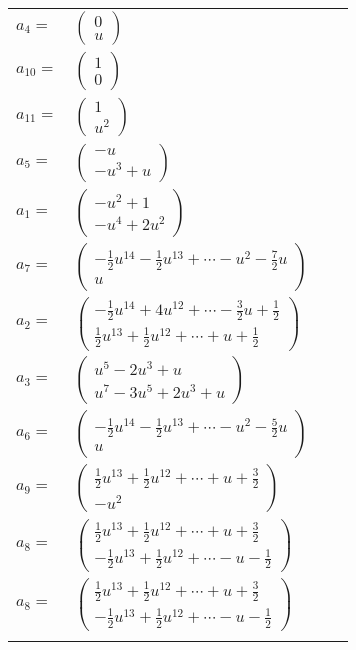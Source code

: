 \documentclass[1p]{elsarticle_modified}
\theoremstyle{definition}
\begin{document}
\begin{tabular}{m{7pt} m{180pt} m{7pt} m{180pt} }
\flushright $a_{4}=$&$\begin{pmatrix}0\\u\end{pmatrix}$ \\
\flushright $a_{10}=$&$\begin{pmatrix}1\\0\end{pmatrix}$ \\
\flushright $a_{11}=$&$\begin{pmatrix}1\\u^2\end{pmatrix}$ \\
\flushright $a_{5}=$&$\begin{pmatrix}- u\\- u^3+u\end{pmatrix}$ \\
\flushright $a_{1}=$&$\begin{pmatrix}- u^2+1\\- u^4+2 u^2\end{pmatrix}$ \\
\flushright $a_{7}=$&$\begin{pmatrix}-\frac{1}{2} u^{14}-\frac{1}{2} u^{13}+\cdots- u^2-\frac{7}{2} u\\u\end{pmatrix}$ \\
\flushright $a_{2}=$&$\begin{pmatrix}-\frac{1}{2} u^{14}+4 u^{12}+\cdots-\frac{3}{2} u+\frac{1}{2}\\\frac{1}{2} u^{13}+\frac{1}{2} u^{12}+\cdots+u+\frac{1}{2}\end{pmatrix}$ \\
\flushright $a_{3}=$&$\begin{pmatrix}u^5-2 u^3+u\\u^7-3 u^5+2 u^3+u\end{pmatrix}$ \\
\flushright $a_{6}=$&$\begin{pmatrix}-\frac{1}{2} u^{14}-\frac{1}{2} u^{13}+\cdots- u^2-\frac{5}{2} u\\u\end{pmatrix}$ \\
\flushright $a_{9}=$&$\begin{pmatrix}\frac{1}{2} u^{13}+\frac{1}{2} u^{12}+\cdots+u+\frac{3}{2}\\- u^2\end{pmatrix}$ \\
\flushright $a_{8}=$&$\begin{pmatrix}\frac{1}{2} u^{13}+\frac{1}{2} u^{12}+\cdots+u+\frac{3}{2}\\-\frac{1}{2} u^{13}+\frac{1}{2} u^{12}+\cdots- u-\frac{1}{2}\end{pmatrix}$\\ \flushright $a_{8}=$&$\begin{pmatrix}\frac{1}{2} u^{13}+\frac{1}{2} u^{12}+\cdots+u+\frac{3}{2}\\-\frac{1}{2} u^{13}+\frac{1}{2} u^{12}+\cdots- u-\frac{1}{2}\end{pmatrix}$\\&\end{tabular}
\end{document}

